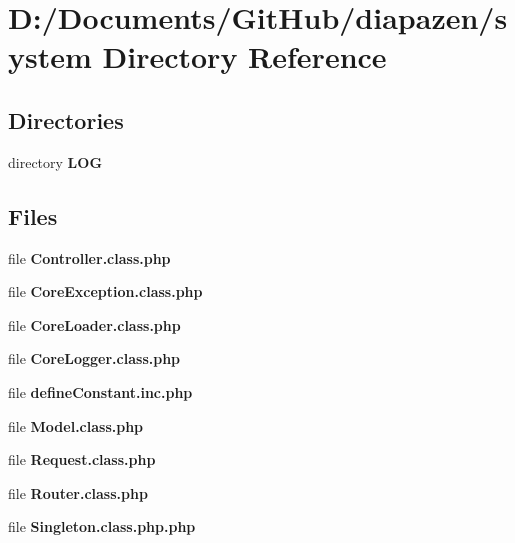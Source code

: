 \section{D\-:/\-Documents/\-Git\-Hub/diapazen/system Directory Reference}
\label{dir_fc35e3e14474bf92f83a9d0f52fcaaf9}
\subsection*{Directories}
\begin{DoxyCompactItemize}
\item 
directory {\bf L\-O\-G}
\end{DoxyCompactItemize}
\subsection*{Files}
\begin{DoxyCompactItemize}
\item 
file {\bfseries Controller.\-class.\-php}
\item 
file {\bfseries Core\-Exception.\-class.\-php}
\item 
file {\bfseries Core\-Loader.\-class.\-php}
\item 
file {\bfseries Core\-Logger.\-class.\-php}
\item 
file {\bfseries define\-Constant.\-inc.\-php}
\item 
file {\bfseries Model.\-class.\-php}
\item 
file {\bfseries Request.\-class.\-php}
\item 
file {\bfseries Router.\-class.\-php}
\item 
file {\bfseries Singleton.\-class.\-php.\-php}
\end{DoxyCompactItemize}
